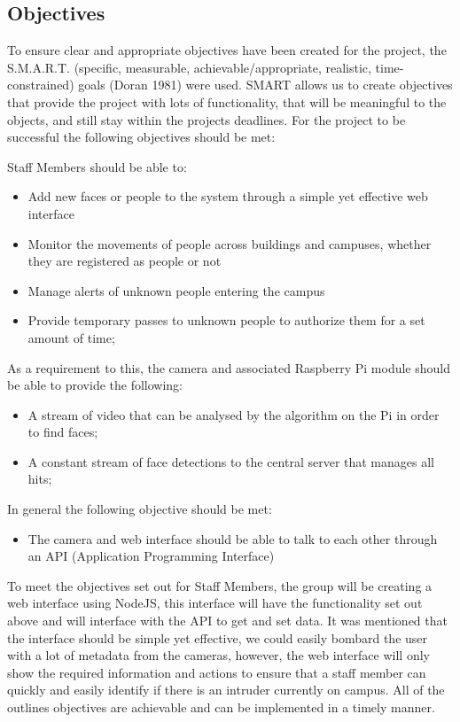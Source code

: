 \documentclass[
  english,
  a4paper,
,tablecaptionabove
]{scrartcl}
\providecommand{\tightlist}{%
  \setlength{\itemsep}{0pt}\setlength{\parskip}{0pt}}
\begin{document}
\hypertarget{objectives}{%
\subsection{Objectives}\label{objectives}}

To ensure clear and appropriate objectives have been created for the
project, the S.M.A.R.T. (specific, measurable, achievable/appropriate,
realistic, time-constrained) goals (Doran 1981) were used. SMART allows
us to create objectives that provide the project with lots of
functionality, that will be meaningful to the objects, and still stay
within the projects deadlines. For the project to be successful the
following objectives should be met:

Staff Members should be able to:

\begin{itemize}
\tightlist
\item
  Add new faces or people to the system through a simple yet effective
  web interface
\item
  Monitor the movements of people across buildings and campuses, whether
  they are registered as people or not
\item
  Manage alerts of unknown people entering the campus
\item
  Provide temporary passes to unknown people to authorize them for a set
  amount of time;
\end{itemize}

As a requirement to this, the camera and associated Raspberry Pi module
should be able to provide the following:

\begin{itemize}
\tightlist
\item
  A stream of video that can be analysed by the algorithm on the Pi in
  order to find faces;
\item
  A constant stream of face detections to the central server that
  manages all hits;
\end{itemize}

In general the following objective should be met:

\begin{itemize}
\tightlist
\item
  The camera and web interface should be able to talk to each other
  through an API (Application Programming Interface)
\end{itemize}

To meet the objectives set out for Staff Members, the group will be
creating a web interface using NodeJS, this interface will have the
functionality set out above and will interface with the API to get and
set data. It was mentioned that the interface should be simple yet
effective, we could easily bombard the user with a lot of metadata from
the cameras, however, the web interface will only show the required
information and actions to ensure that a staff member can quickly and
easily identify if there is an intruder currently on campus. All of the
outlines objectives are achievable and can be implemented in a timely
manner.
\end{document}
